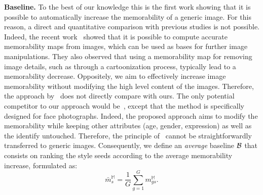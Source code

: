 \documentclass{sig-alternate-05-2015}
\begin{document}

\textbf{Baseline.} To the best of our knowledge this is the first work showing that it is possible to automatically increase the memorability of a generic image. For this reason, a direct and quantitative comparison with previous studies is not possible. Indeed, the recent work~\cite{khosla2015understanding} showed that it is possible to compute accurate memorability maps from images, which can be used as bases for further image manipulations. They also observed that using a memorability map for removing image details, such as through a cartoonization process, typically lead to a memorability decrease. Oppositely, we aim to effectively increase image memorability without modifying the high level content of the images. Therefore, the approach by~\cite{khosla2015understanding} does not directly compare with ours. The only potential competitor to our approach would be~\cite{khosla2013modifying}, except that the method is specifically designed for face photographs. Indeed, the proposed approach aims to modify the memorability while keeping other attributes (age, gender, expression) as well as the identify untouched. Therefore, the principle of~\cite{khosla2013modifying} cannot be straightforwardly transferred to generic images. Consequently, we define an \textit{average} baseline ${\cal B}$ that consists on ranking the style seeds according to the average memorability increase, formulated as:
\begin{equation}
\bar{m}_s^\mathbb{M} = \frac{1}{G} \sum_{g=1}^{G} m_{gs}^\mathbb{M}.
\end{equation}
\end{document}

